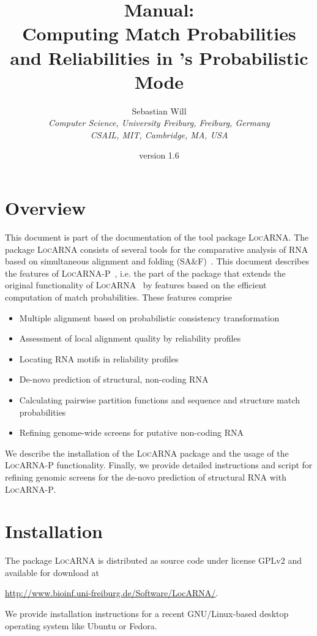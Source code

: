 \documentclass{article}
\title{\LocARNAP{} Manual:\\ Computing Match Probabilities and
  Reliabilities in \LocARNA{}'s Probabilistic Mode}
\author{Sebastian Will\\[6pt]
\normalsize
  \emph{Computer Science, University Freiburg, Freiburg, Germany}\\
\normalsize
  \emph{CSAIL, MIT, Cambridge, MA, USA}
}
\date{\LocARNA{} version 1.6}
\newcommand{\LocARNA}{\textsc{LocARNA}}
\newcommand{\LocARNAP}{\textsc{LocARNA-P}}
\begin{document}
\maketitle

\section*{Overview}

This document is part of the documentation of the tool package
\LocARNA{}. The package \LocARNA{} consists of several tools for the
comparative analysis of RNA based on simultaneous alignment and
folding (SA\&F)~\cite{sankoff85}. This document describes the features
of \LocARNAP{}~\cite{Will:LocARNAP:unpublished}, i.e. the part of the package that
extends the original functionality of \LocARNA{}~\cite{Will:etal:_infer_non_codin_rna_famil:PLOS2007} by
features based on the efficient computation of match
probabilities. These features comprise
\begin{itemize}
\item Multiple alignment based on probabilistic consistency
  transformation
\item Assessment of local alignment quality by reliability profiles
\item Locating RNA motifs in reliability profiles
\item De-novo prediction of structural, non-coding RNA
\item Calculating pairwise partition functions and sequence and
  structure match probabilities
\item Refining genome-wide screens for putative non-coding RNA
\end{itemize}

We describe the installation of the \LocARNA{} package and the usage
of the \LocARNAP{} functionality. Finally, we provide detailed
instructions and script for refining genomic screens for the de-novo
prediction of structural RNA with \LocARNAP{}.

\section{Installation}

The package \LocARNA{} is distributed as source code under license
GPLv2 and available for download at
\begin{center}
  \url{http://www.bioinf.uni-freiburg.de/Software/LocARNA/}.
\end{center}
%
We provide installation instructions for a recent GNU/Linux-based
desktop operating system like Ubuntu or Fedora. 
\end{document}
